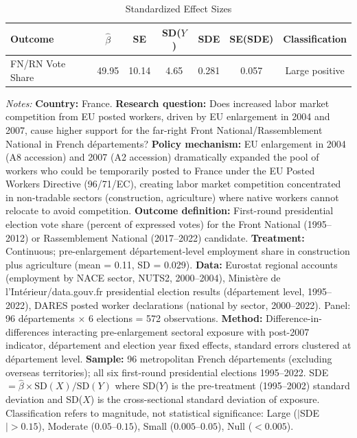 \begin{table}[htbp]
\centering
\caption{Standardized Effect Sizes}
\label{tab:sde}
\begin{tabular}{lcccccc}
\toprule
Outcome & $\hat{\beta}$ & SE & SD($Y$) & SDE & SE(SDE) & Classification \\
\midrule
FN/RN Vote Share & 49.95 & 10.14 & 4.65 & 0.281 & 0.057 & Large positive \\
\bottomrule
\end{tabular}
\begin{tablenotes}[flushleft]\small
\item \textit{Notes:} \textbf{Country:} France. \textbf{Research question:} Does increased labor market competition from EU posted workers, driven by EU enlargement in 2004 and 2007, cause higher support for the far-right Front National/Rassemblement National in French d\'epartements? \textbf{Policy mechanism:} EU enlargement in 2004 (A8 accession) and 2007 (A2 accession) dramatically expanded the pool of workers who could be temporarily posted to France under the EU Posted Workers Directive (96/71/EC), creating labor market competition concentrated in non-tradable sectors (construction, agriculture) where native workers cannot relocate to avoid competition. \textbf{Outcome definition:} First-round presidential election vote share (percent of expressed votes) for the Front National (1995--2012) or Rassemblement National (2017--2022) candidate. \textbf{Treatment:} Continuous; pre-enlargement d\'epartement-level employment share in construction plus agriculture (mean = 0.11, SD = 0.029). \textbf{Data:} Eurostat regional accounts (employment by NACE sector, NUTS2, 2000--2004), Minist\`ere de l'Int\'erieur/data.gouv.fr presidential election results (d\'epartement level, 1995--2022), DARES posted worker declarations (national by sector, 2000--2022). Panel: 96 d\'epartements $\times$ 6 elections = 572 observations. \textbf{Method:} Difference-in-differences interacting pre-enlargement sectoral exposure with post-2007 indicator, d\'epartement and election year fixed effects, standard errors clustered at d\'epartement level. \textbf{Sample:} 96 metropolitan French d\'epartements (excluding overseas territories); all six first-round presidential elections 1995--2022. SDE $= \hat{\beta} \times \text{SD}(X) / \text{SD}(Y)$ where SD($Y$) is the pre-treatment (1995--2002) standard deviation and SD($X$) is the cross-sectional standard deviation of exposure. Classification refers to magnitude, not statistical significance: Large ($|$SDE$| > 0.15$), Moderate ($0.05$--$0.15$), Small ($0.005$--$0.05$), Null ($< 0.005$).
\end{tablenotes}
\end{table}
